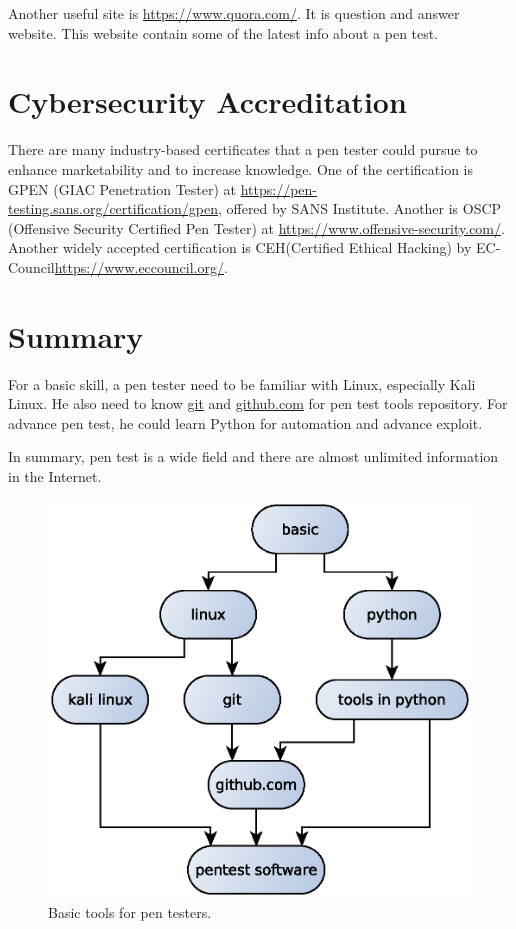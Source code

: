 \documentclass[7x9]{times}
\begin{document}
Another useful site is \url{https://www.quora.com/}. It is question and answer
website. This website contain some of the latest info about a pen test.



\section{Cybersecurity Accreditation}

There are many industry-based certificates that a pen tester
could pursue to enhance marketability and to increase knowledge. One of the 
certification is GPEN (GIAC Penetration Tester) at 
\url{https://pen-testing.sans.org/certification/gpen}, offered by SANS  
Institute. Another is OSCP (Offensive
Security Certified Pen Tester) at \url{https://www.offensive-security.com/}.
Another widely accepted certification is CEH(Certified Ethical Hacking) by 
EC-Council\url{https://www.eccouncil.org/}.

 
\section{Summary}

For a basic skill, a pen tester need to be familiar with Linux, especially Kali
Linux. He also need to know \url{git} and \url{github.com} for pen test tools
repository. For advance pen test, he could learn Python for automation and 
advance exploit.

In summary, pen test is a wide field and there are almost unlimited information
in the Internet. 
\begin{center}
	\begin{figure}[ht]
		\includegraphics[scale=.75]{tools.eps}
		\caption{Basic tools for pen testers.}
	\end{figure}
\end{center}
\end{document}
